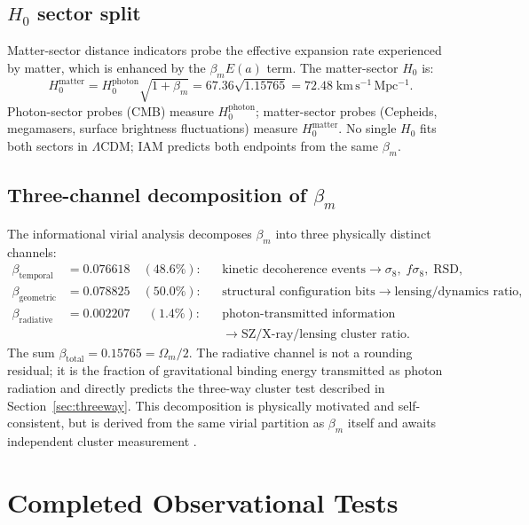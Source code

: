 \documentclass[12pt,a4paper]{article}
\begin{document}
\subsection{$H_0$ sector split}

Matter-sector distance indicators probe the effective expansion rate experienced by
matter, which is enhanced by the $\beta_m E(a)$ term. The matter-sector $H_0$
is:
\begin{equation}
  H_0^{\mathrm{matter}} = H_0^{\mathrm{photon}}\sqrt{1 + \beta_m}
  = 67.36\sqrt{1.15765} = 72.48\;\mathrm{km\,s^{-1}\,Mpc^{-1}}.
  \label{eq:H0matter}
\end{equation}
Photon-sector probes (CMB) measure $H_0^{\mathrm{photon}}$; matter-sector probes
(Cepheids, megamasers, surface brightness fluctuations) measure
$H_0^{\mathrm{matter}}$. No single $H_0$ fits both sectors in $\Lambda$CDM;
IAM predicts both endpoints from the same $\beta_m$.

\subsection{Three-channel decomposition of $\beta_m$}

The informational virial analysis decomposes $\beta_m$ into three physically distinct
channels:
\begin{align*}
  \beta_\mathrm{temporal}  &= 0.076618 \quad (48.6\%):
    &&\text{kinetic decoherence events} \to \sigma_8,\;f\sigma_8,\;\mathrm{RSD},\\
  \beta_\mathrm{geometric} &= 0.078825 \quad (50.0\%):
    &&\text{structural configuration bits} \to \text{lensing/dynamics ratio},\\
  \beta_\mathrm{radiative} &= 0.002207 \quad\ \ (1.4\%):
    &&\text{photon-transmitted information}\\
    &&&\to \text{SZ/X-ray/lensing cluster ratio}.
\end{align*}
The sum $\beta_\mathrm{total} = 0.15765 = \Omega_m/2$. The radiative channel is not a
rounding residual; it is the fraction of gravitational binding energy transmitted as
photon radiation and directly predicts the three-way cluster test described in
Section~\ref{sec:threeway}. This decomposition is physically motivated and
self-consistent, but is derived from the same virial partition as $\beta_m$ itself
and awaits independent cluster measurement \citep[Section~\ref{sec:threeway}]{}.

\section{Completed Observational Tests}
\label{sec:tests}
\end{document}
